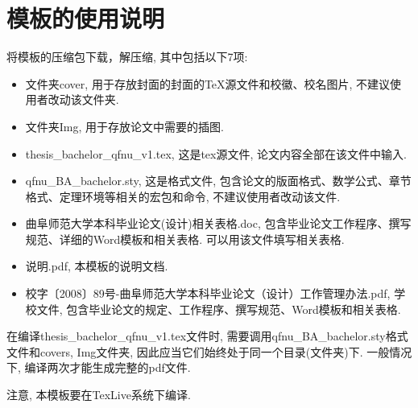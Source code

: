 \section{模板的使用说明}

将模板的压缩包下载，解压缩, 其中包括以下7项:
\begin{itemize}
  \item 文件夹cover, 用于存放封面的封面的\TeX 源文件和校徽、校名图片, 不建议使用者改动该文件夹.
  \item 文件夹Img, 用于存放论文中需要的插图.
  \item  thesis\_bachelor\_qfnu\_v1.tex, 这是tex源文件, 论文内容全部在该文件中输入.
  \item  qfnu\_BA\_bachelor.sty, 这是格式文件, 包含论文的版面格式、数学公式、章节格式、定理环境等相关的宏包和命令, 不建议使用者改动该文件.
  \item 曲阜师范大学本科毕业论文(设计)相关表格.doc, 包含毕业论文工作程序、撰写规范、详细的Word模板和相关表格. 可以用该文件填写相关表格.
  \item 说明.pdf, 本模板的说明文档.
  \item 校字〔2008〕89号-曲阜师范大学本科毕业论文（设计）工作管理办法.pdf, 学校文件, 包含毕业论文的规定、工作程序、撰写规范、Word模板和相关表格.

\end{itemize}
在编译thesis\_bachelor\_qfnu\_v1.tex文件时, 需要调用qfnu\_BA\_bachelor.sty格式文件和covers, Img文件夹, 因此应当它们始终处于同一个目录(文件夹)下. 一般情况下, 编译两次才能生成完整的pdf文件.

注意, 本模板要在TexLive系统下编译.

